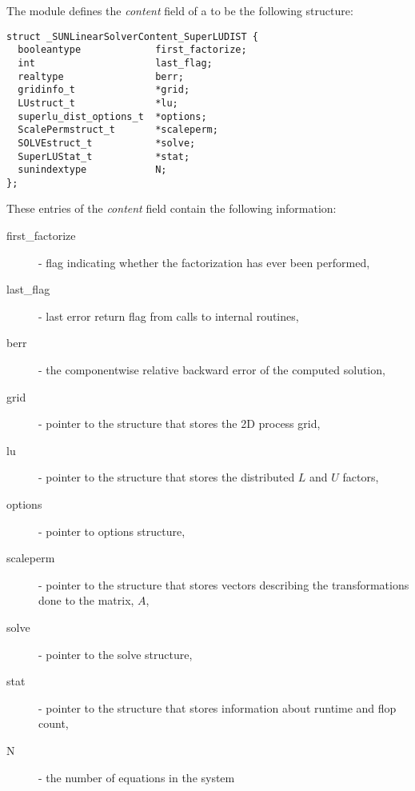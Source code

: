 The {\sunlinsolsludist} module defines the {\em
content} field of a  to be the following structure:
\begin{verbatim}
struct _SUNLinearSolverContent_SuperLUDIST {
  booleantype             first_factorize;
  int                     last_flag;
  realtype                berr;
  gridinfo_t              *grid;
  LUstruct_t              *lu;
  superlu_dist_options_t  *options;
  ScalePermstruct_t       *scaleperm;
  SOLVEstruct_t           *solve;
  SuperLUStat_t           *stat;
  sunindextype            N;
};
\end{verbatim}
These entries of the \emph{content} field contain the following
information:
\begin{description}
  \item[first\_factorize] - flag indicating whether the factorization
    has ever been performed,
  \item[last\_flag] - last error return flag from calls to internal routines,
  \item[berr] - the componentwise relative backward error of the computed solution,
  \item[grid] - pointer to the {\superludist} structure that stores the 2D process grid,
  \item[lu] - pointer to the {\superludist} structure that stores the distributed $L$
    and $U$ factors,
  \item[options] - pointer to {\superludist} options structure,
  \item[scaleperm] - pointer to the {\superludist} structure that stores vectors describing
    the transformations done to the matrix, $A$,
  \item[solve] - pointer to the {\superludist} solve structure,
  \item[stat] - pointer to the {\superludist} structure that stores information about runtime
    and flop count,
  \item[N] - the number of equations in the system
\end{description}
